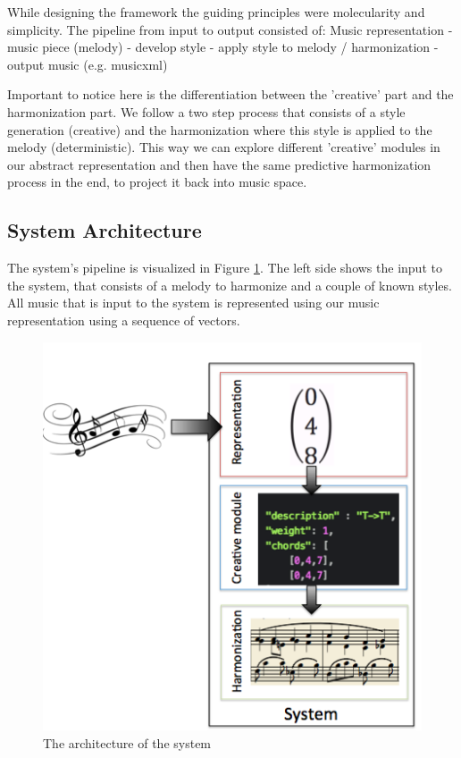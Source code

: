 While designing the framework the guiding principles were molecularity and simplicity. The pipeline from input to output consisted of: Music representation - music piece (melody) - develop style - apply style to melody / harmonization - output music (e.g. musicxml)

Important to notice here is the differentiation between the 'creative' part and the harmonization part. We follow a two step process that consists of a style generation (creative) and the harmonization where this style is applied to the melody (deterministic). This way we can explore different 'creative' modules in our abstract representation and then have the same predictive harmonization process in the end, to project it back into music space.

\subsection{System Architecture}
The system's pipeline is visualized in Figure \ref{fig:arch}. The left side shows the input to the system, that consists of a melody to harmonize and a couple of known styles. All music that is input to the system is represented using our music representation using a sequence of vectors.
\begin{figure}
\includegraphics[scale=1]{Chapters/pic/sys_arch.png}
\caption{The architecture of the system}
\label{fig:arch}
\end{figure}


